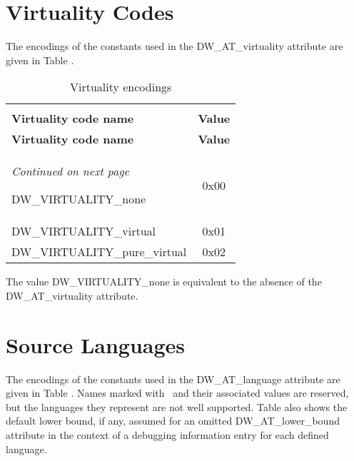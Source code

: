 \section{Virtuality Codes}
\label{datarep:vitualitycodes}

The encodings of the constants used in the 
DW\_AT\_virtuality attribute are given in 
Table .

\begin{centering}
\setlength{\extrarowheight}{0.1cm}
\begin{longtable}{l|c}
  \caption{Virtuality encodings} \label{tab:virtualityencodings}\\
  \hline \\ \bfseries Virtuality code name&\bfseries Value \\ \hline
\endfirsthead
  \bfseries Virtuality code name&\bfseries Value\\ \hline
\endhead
  \hline \emph{Continued on next page}
\endfoot
  \hline
\endlastfoot

DW\_VIRTUALITY\_none&0x00 \\
DW\_VIRTUALITY\_virtual&0x01 \\
DW\_VIRTUALITY\_pure\_virtual&0x02 \\



\end{longtable}
\end{centering}

The value 
DW\_VIRTUALITY\_none is equivalent to the absence of the 
DW\_AT\_virtuality
attribute.

\section{Source Languages}
\label{datarep:sourcelanguages}

The encodings of the constants used in the DW\_AT\_language
attribute are given in 
Table .
Names marked with
\dag \  
and their associated values are reserved, but the
languages they represent are not well supported. 
Table 
also shows the default lower bound, if any, assumed for
an omitted DW\_AT\_lower\_bound attribute in the context of a
 debugging information entry for each
defined language.

